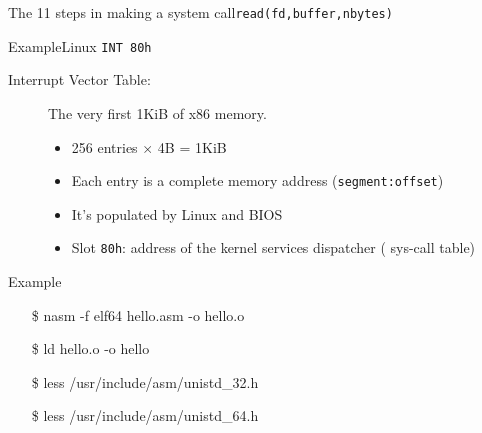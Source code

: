 \begin{frame}
  \begin{center}
  \end{center}
\end{frame}

\begin{frame}{The 11 steps in making a system call}{\texttt{read(fd,buffer,nbytes)}}
  \begin{center}
  \end{center}
\end{frame}

\begin{frame}{Example}{Linux \texttt{INT 80h}}
  \begin{description}
  \item[Interrupt Vector Table:] The very first 1KiB of x86 memory. 
    \begin{itemize} 
    \item 256 entries $\times$ 4B = 1KiB
    \item Each entry is a complete memory address (\texttt{segment:offset})
    \item It's populated by Linux and BIOS
    \item Slot \texttt{80h}: address of the kernel services dispatcher ({\pright} sys-call table)
    \end{itemize}
  \end{description}
\end{frame}

\begin{frame}{Example}
  \begin{center}
  \end{center}
  \begin{iblock}{}
    \ttfamily\footnotesize
    \begin{enumerate}
    \item[\$] nasm -f elf64 hello.asm -o hello.o
    \item[\$] ld hello.o -o hello
    \item[\$] less /usr/include/asm/unistd\_32.h
    \item[\$] less /usr/include/asm/unistd\_64.h
    \end{enumerate}
  \end{iblock}
\end{frame}

